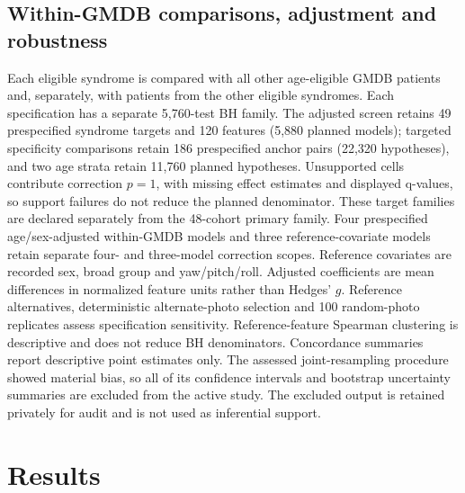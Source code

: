 \documentclass[11pt]{article}
\begin{document}
\subsection{Within-GMDB comparisons, adjustment and robustness}
Each eligible syndrome is compared with all other age-eligible GMDB patients and, separately, with patients from the other eligible syndromes. Each specification has a separate 5,760-test BH family. The adjusted screen retains 49 prespecified syndrome targets and 120 features (5,880 planned models); targeted specificity comparisons retain 186 prespecified anchor pairs (22,320 hypotheses), and two age strata retain 11,760 planned hypotheses. Unsupported cells contribute correction $p=1$, with missing effect estimates and displayed q-values, so support failures do not reduce the planned denominator. These target families are declared separately from the 48-cohort primary family.
Four prespecified age/sex-adjusted within-GMDB models and three reference-covariate models retain separate four- and three-model correction scopes. Reference covariates are recorded sex, broad group and yaw/pitch/roll. Adjusted coefficients are mean differences in normalized feature units rather than Hedges' $g$. Reference alternatives, deterministic alternate-photo selection and 100 random-photo replicates assess specification sensitivity. Reference-feature Spearman clustering is descriptive and does not reduce BH denominators.
Concordance summaries report descriptive point estimates only. The assessed joint-resampling procedure showed material bias, so all of its confidence intervals and bootstrap uncertainty summaries are excluded from the active study. The excluded output is retained privately for audit and is not used as inferential support.
\section{Results}
\end{document}
